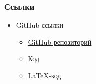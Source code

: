 \documentclass{beamer}
\begin{document}
\begin{frame}
\frametitle{Ссылки}
		\begin{itemize}
			\item {GitHub ссылки
			\begin{itemize}
			\item \href{https://github.com/Art232/-2022}{GitHub-репозиторий}
			\item \href{https://goo-gl.me/g9NWZ}{Код}
			\item \href{https://github.com/Nelifax/Summer-practice/blob/7bea7073e4a0e0341c1cacd58ebccdce28801e29/LaTeX_work.tex}{LaTeX-код}
			\end{itemize}}
		\end{itemize}
	\end{frame}
\end{document}

